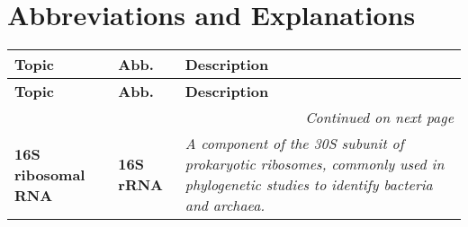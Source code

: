 \chapter{Abbreviations and Explanations}
\setlength{\headheight}{12.71342pt}
\addtolength{\topmargin}{-0.71342pt}


\begin{longtable}{| p{5cm} | p{2cm} | p{7.5cm} |}
    \hline
    \textbf{Topic} & \textbf{Abb.} & \textbf{Description} \\ 
    \hline
    \endfirsthead
    
    \hline
    \textbf{Topic} & \textbf{Abb.} & \textbf{Description} \\ 
    \hline
    \endhead
    
    \hline \multicolumn{3}{r}{\textit{Continued on next page}} \\ 
    \endfoot
    
    \hline
    \endlastfoot
    
    \textbf{16S ribosomal RNA} & \textbf{16S rRNA} & \textit{A component of the 30S subunit of prokaryotic ribosomes, commonly used in phylogenetic studies to identify bacteria and archaea.} \\
    \hline
    \end{longtable}

